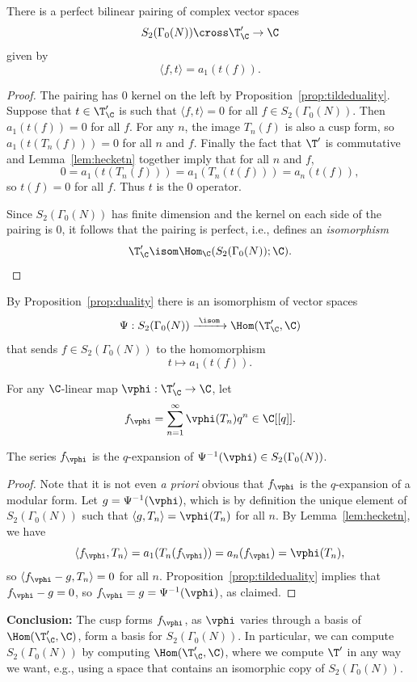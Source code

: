 \begin{proposition}\label{prop:duality}
There is a perfect bilinear pairing of complex vector spaces
$$
  S_2(\Gamma_0(N)) \cross \T'_\C \to \C
$$
given by 
$$
  \langle f, t \rangle = a_1(t(f)).
$$
\end{proposition}
\begin{proof}
The pairing has $0$ kernel on the left by
Proposition~\ref{prop:tildeduality}.
Suppose that $t\in\T'_\C$ is such that 
$\langle f, t\rangle =0$ for all $f \in S_2(\Gamma_0(N))$.
Then $a_1(t(f)) = 0$ for all $f$.  For any $n$, the image
$T_n(f)$ is also a cusp form, so $a_1(t(T_n(f))) = 0$
for all $n$ and $f$.  Finally the fact that $\T'$ is commutative
and Lemma~\ref{lem:hecketn} together imply that for all $n$
and $f$,
$$
  0 = a_1(t(T_n(f))) = a_1(T_n(t(f))) = a_n(t(f)),
$$
so $t(f)=0$ for all $f$.  Thus $t$ is the $0$ operator.

Since $S_2(\Gamma_0(N))$ has finite dimension and the 
kernel on each side of the pairing is $0$, it follows
that the pairing is perfect, i.e., defines an {\em isomorphism}
$$
  \T'_\C \isom \Hom_{\C}(S_2(\Gamma_0(N));\C).
$$
\end{proof}


By Proposition~\ref{prop:duality} there is an isomorphism of vector spaces
\begin{equation}\label{eqn:s2isomtdual}
 \Psi: S_2(\Gamma_0(N)) \xrightarrow{\,\,\isom\,\,} \Hom(\T'_\C,\C)
\end{equation}
that sends $f \in S_2(\Gamma_0(N))$ to the homomorphism
$$t \mapsto a_1(t(f)).$$

For any $\C$-linear map $\vphi:\T'_\C\to \C$, let 
$$
 f_{\vphi} = \sum_{n=1}^{\infty} \vphi(T_n)q^n \in\C[[q]].
$$
\begin{lemma}
The series $f_{\vphi}$ is the $q$-expansion of 
$\Psi^{-1}(\vphi) \in S_2(\Gamma_0(N))$.
\end{lemma}
\begin{proof}
Note that it is not even {\em a priori} obvious that $f_{\vphi}$
is the $q$-expansion of a modular form. 
Let $g = \Psi^{-1}(\vphi)$, which is by definition the unique element of 
$S_2(\Gamma_0(N))$ such that $\langle g, T_n \rangle = \vphi(T_n)$
for all $n$.
By Lemma~\ref{lem:hecketn}, we have 
$$
 \langle f_{\vphi}, T_n \rangle = a_1(T_n(f_\vphi)) = a_n(f_{\vphi}) = \vphi(T_n),
$$
so $\langle f_{\vphi} - g, T_n \rangle = 0$ for all $n$.
Proposition~\ref{prop:tildeduality} implies that
$f_\vphi - g = 0$, so $f_{\vphi} = g = \Psi^{-1}(\vphi)$,
as claimed.
\end{proof}
{\bf \noindent{}Conclusion:}  
The cusp forms $f_{\vphi}$, as $\vphi$ varies through a 
basis of $\Hom(\T'_\C,\C)$, form a basis
for $S_2(\Gamma_0(N))$.  
In particular, we can compute $S_2(\Gamma_0(N))$
by computing $\Hom(\T'_{\C},\C)$, where we compute $\T'$ in any way we want,
e.g., using a space that contains an isomorphic copy of $S_2(\Gamma_0(N))$.

